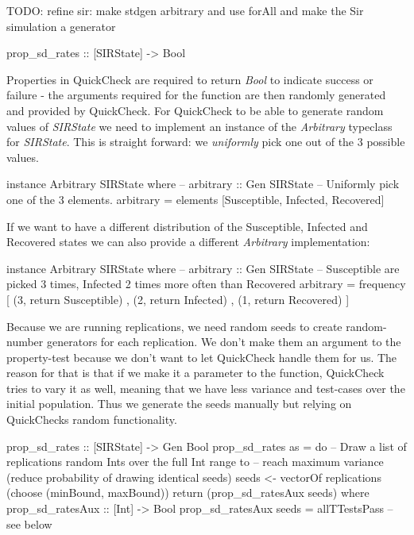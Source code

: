 TODO: refine sir: make stdgen arbitrary and use forAll and make the Sir simulation a generator

\begin{HaskellCode}
prop_sd_rates :: [SIRState] -> Bool
\end{HaskellCode}

Properties in QuickCheck are required to return \textit{Bool} to indicate success or failure - the arguments required for the function are then randomly generated and provided by QuickCheck. For QuickCheck to be able to generate random values of \textit{SIRState} we need to implement an instance of the \textit{Arbitrary} typeclass for \textit{SIRState}. This is straight forward: we \textit{uniformly} pick one out of the 3 possible values.

\begin{HaskellCode}
instance Arbitrary SIRState where
  -- arbitrary :: Gen SIRState
  -- Uniformly pick one of the 3 elements.
  arbitrary = elements [Susceptible, Infected, Recovered]
\end{HaskellCode}

If we want to have a different distribution of the Susceptible, Infected and Recovered states we can also provide a different \textit{Arbitrary} implementation:

\begin{HaskellCode}
instance Arbitrary SIRState where
  -- arbitrary :: Gen SIRState
  -- Susceptible are picked 3 times, Infected 2 times more often than Recovered
  arbitrary = frequency [ (3, return Susceptible)
                        , (2, return Infected)
                        , (1, return Recovered) ]
\end{HaskellCode}

Because we are running replications, we need random seeds to create random-number generators for each replication. We don't make them an argument to the property-test because we don't want to let QuickCheck handle them for us. The reason for that is that if we make it a parameter to the function, QuickCheck tries to vary it as well, meaning that we have less variance and test-cases over the initial population. Thus we generate the seeds manually but relying on QuickChecks random functionality.

\begin{HaskellCode}
prop_sd_rates :: [SIRState] -> Gen Bool
prop_sd_rates as = do
    -- Draw a list of replications random Ints over the full Int range to  
    -- reach maximum variance (reduce probability of drawing identical seeds)
    seeds <- vectorOf replications (choose (minBound, maxBound))
    return (prop_sd_ratesAux seeds)
  where
    prop_sd_ratesAux :: [Int] -> Bool
    prop_sd_ratesAux seeds = allTTestsPass -- see below
\end{HaskellCode}

